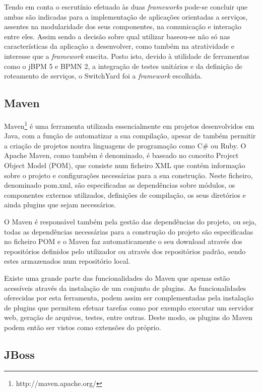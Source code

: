 Tendo em conta o escrutínio efetuado às duas \textit{frameworks} pode-se concluir que ambas são indicadas para a implementação de aplicações orientadas a serviços, assentes na modularidade dos seus componentes, na comunicação e interação entre eles. Assim sendo a decisão sobre qual utilizar baseou-se não só nas características da aplicação a desenvolver, como também na atratividade e interesse que a \textit{framework} suscita. Posto isto, devido à utilidade de ferramentas como o jBPM 5 e BPMN 2, a integração de testes unitários e da definição de roteamento de serviços, o SwitchYard foi a \textit{framework} escolhida.


\subsection{Maven}

Maven\footnote{http://maven.apache.org/} é uma ferramenta utilizada essencialmente em projetos desenvolvidos em Java, com a função de automatizar a sua compilação, apesar de também permitir a criação de projetos noutra linguagens de programação como C\# ou Ruby. O Apache Maven, como também é denominado, é baseado no conceito Project Object Model (POM), que consiste num ficheiro XML que contém informação sobre o projeto e configurações necessárias para a sua construção. Neste ficheiro, denominado pom.xml, são especificadas as dependências sobre módulos, os componentes externos utilizados, definições de compilação, os seus diretórios e ainda plugins que sejam necessários.

O Maven é responsável também pela gestão das dependências do projeto, ou seja, todas as dependências necessárias para a construção do projeto são especificadas no ficheiro POM e o Maven faz automaticamente o seu download através dos repositórios definidos pelo utilizador ou através dos repositórios padrão, sendo estes armazenados num repositório local.

Existe uma grande parte das funcionalidades do Maven que apenas estão acessíveis através da instalação de um conjunto de plugins. As funcionalidades oferecidas por esta ferramenta, podem assim ser complementadas pela instalação de plugins que permitem efetuar tarefas como por exemplo executar um servidor web, geração de arquivos, testes, entre outras. Deste modo, os plugins do Maven podem então ser vistos como extensões do próprio.

\subsection{JBoss}


